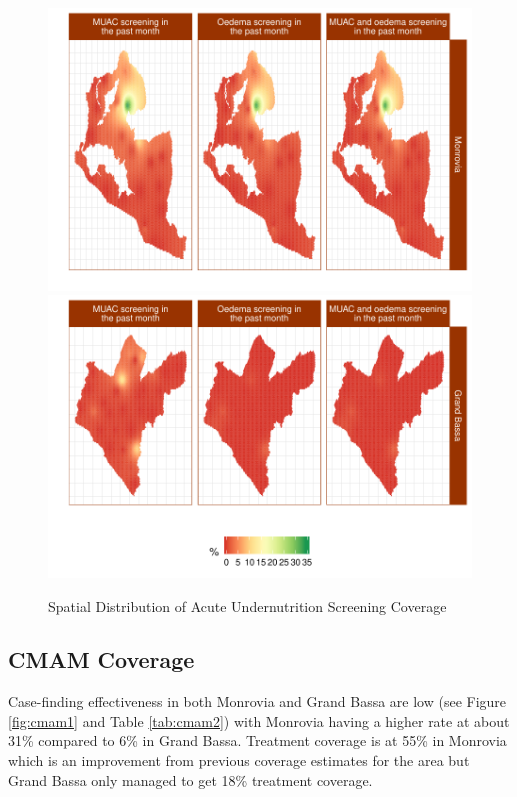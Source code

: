 \documentclass[12pt,a4paper]{article}
\begin{document}
\begin{figure}[H]

{\centering \includegraphics{liberiaCoverageReport_files/figure-latex/screenMap-1} \includegraphics{liberiaCoverageReport_files/figure-latex/screenMap-2} 

}

\caption{Spatial Distribution of Acute Undernutrition Screening Coverage}\label{fig:screenMap}
\end{figure}

\newpage

\hypertarget{cmam-coverage-1}{%
\subsection{CMAM Coverage}\label{cmam-coverage-1}}

Case-finding effectiveness in both Monrovia and Grand Bassa are low (see Figure \ref{fig:cmam1} and Table \ref{tab:cmam2}) with Monrovia having a higher rate at about 31\% compared to 6\% in Grand Bassa. Treatment coverage is at 55\% in Monrovia which is an improvement from previous coverage estimates for the area but Grand Bassa only managed to get 18\% treatment coverage.
\end{document}
